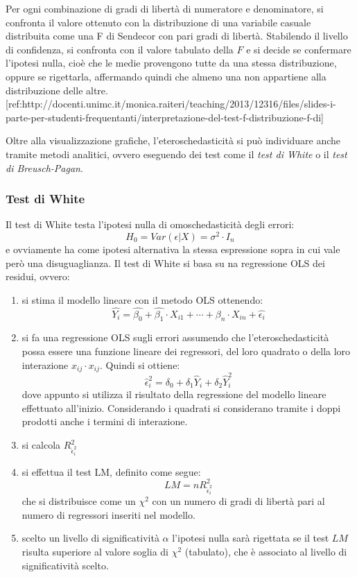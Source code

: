 \begin{tcolorbox}[colback=cyan!5!white, colframe=cyan!75!black, title = ANOVA]
	Per ogni combinazione di gradi di libertà di numeratore e denominatore, si confronta il valore ottenuto con la distribuzione di una variabile casuale distribuita come una F di Sendecor con pari gradi di libertà. Stabilendo il livello di confidenza, si confronta con il valore tabulato della $F$ e si decide se confermare l'ipotesi nulla, cioè che le medie provengono tutte da una stessa distribuzione, oppure se rigettarla, affermando quindi che almeno una non appartiene alla distribuzione delle altre.	
	[ref:http://docenti.unimc.it/monica.raiteri/teaching/2013/12316/files/slides-i-parte-per-studenti-frequentanti/interpretazione-del-test-f-distribuzione-f-di]
\end{tcolorbox}
Oltre alla visualizzazione grafiche, l'eteroschedasticità si può individuare anche tramite metodi analitici, ovvero eseguendo dei test come il \textit{test di White} o il \textit{test di Breusch-Pagan}.
\subsubsection{Test di White}
Il test di White testa l'ipotesi nulla di omoschedasticità degli errori:
\begin{equation}
H_0 = Var(\epsilon \vert X) = \sigma^2 \cdot I_n
\end{equation}
e ovviamente ha come ipotesi alternativa la stessa espressione sopra in cui vale però una disuguaglianza.
Il test di White si basa su na regressione OLS dei residui, ovvero:
\begin{enumerate}
	\item si stima il modello lineare con il metodo OLS ottenendo:
	\begin{equation}
	\hat{Y_i} = \hat{\beta_0} + \hat{\beta_1} \cdot X_{i1} + \cdots + \beta_n \cdot X_{in} + \hat{\epsilon_i}
	\end{equation}
	\item si fa una regressione OLS  sugli errori assumendo che l'eteroschedasticità possa essere una funzione lineare dei regressori, del loro quadrato o della loro interazione $x_{ij}\cdot x_{ij}$. Quindi si ottiene:
	\begin{equation}
	\hat{\epsilon}_i^2 = \delta_0 + \delta_1 \hat{Y}_i + \delta_2 \hat{Y}_i^2
	\end{equation}
	dove appunto si utilizza il risultato della regressione del modello lineare effettuato all'inizio. Considerando i quadrati si considerano tramite i doppi prodotti anche i termini di interazione.
	\item si calcola $R^2_{\hat{\epsilon}_i^2}$
	\item si effettua il test LM, definito come segue:
	\begin{equation}
	LM = nR^2_{\hat{\epsilon}_i^2}
	\end{equation}
	che si distribuisce come un $\chi^2$ con un numero di gradi di libertà pari al numero di regressori inseriti nel modello.
	\item scelto un livello di significatività $\alpha$ l'ipotesi nulla sarà rigettata se il test $LM$ risulta superiore al valore soglia di $\chi^2$ (tabulato), che è associato al livello di significatività scelto.
\end{enumerate}
